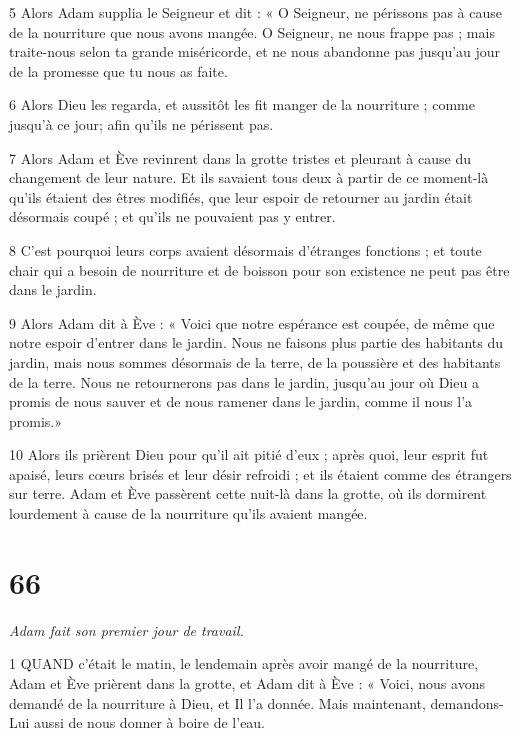 \par 5 Alors Adam supplia le Seigneur et dit : « O Seigneur, ne périssons pas à cause de la nourriture que nous avons mangée. O Seigneur, ne nous frappe pas ; mais traite-nous selon ta grande miséricorde, et ne nous abandonne pas jusqu'au jour de la promesse que tu nous as faite.

\par 6 Alors Dieu les regarda, et aussitôt les fit manger de la nourriture ; comme jusqu'à ce jour; afin qu'ils ne périssent pas.

\par 7 Alors Adam et Ève revinrent dans la grotte tristes et pleurant à cause du changement de leur nature. Et ils savaient tous deux à partir de ce moment-là qu'ils étaient des êtres modifiés, que leur espoir de retourner au jardin était désormais coupé ; et qu'ils ne pouvaient pas y entrer.

\par 8 C'est pourquoi leurs corps avaient désormais d'étranges fonctions ; et toute chair qui a besoin de nourriture et de boisson pour son existence ne peut pas être dans le jardin.

\par 9 Alors Adam dit à Ève : « Voici que notre espérance est coupée, de même que notre espoir d'entrer dans le jardin. Nous ne faisons plus partie des habitants du jardin, mais nous sommes désormais de la terre, de la poussière et des habitants de la terre. Nous ne retournerons pas dans le jardin, jusqu'au jour où Dieu a promis de nous sauver et de nous ramener dans le jardin, comme il nous l'a promis.»

\par 10 Alors ils prièrent Dieu pour qu'il ait pitié d'eux ; après quoi, leur esprit fut apaisé, leurs cœurs brisés et leur désir refroidi ; et ils étaient comme des étrangers sur terre. Adam et Ève passèrent cette nuit-là dans la grotte, où ils dormirent lourdement à cause de la nourriture qu'ils avaient mangée.

\chapter{66}

\par \textit{Adam fait son premier jour de travail.}

\par 1 QUAND c'était le matin, le lendemain après avoir mangé de la nourriture, Adam et Ève prièrent dans la grotte, et Adam dit à Ève : « Voici, nous avons demandé de la nourriture à Dieu, et Il l'a donnée. Mais maintenant, demandons-Lui aussi de nous donner à boire de l’eau.

